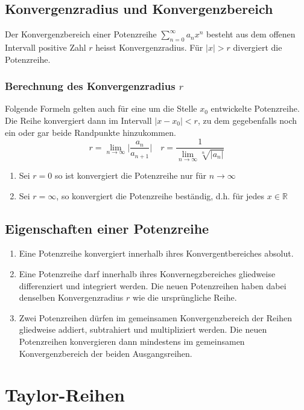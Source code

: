 \subsection{Konvergenzradius und Konvergenzbereich}

Der Konvergenzbereich einer Potenzreihe $\displaystyle \sum_{n=0}^{\infty}a_nx^n$ besteht aus dem offenen Intervall positive Zahl $r$ heisst Konvergenzradius. Für $\Big\vert x\Big\vert>r$ divergiert die Potenzreihe.
\subsubsection{Berechnung des Konvergenzradius $r$}
Folgende Formeln gelten auch für eine um die Stelle $x_0$ entwickelte Potenzreihe. Die Reihe konvergiert dann im Intervall $\Big\vert x-x_0\Big\vert<r$, zu dem gegebenfalls noch ein oder gar beide Randpunkte hinzukommen. 
\begin{equation} 
\boxed{r=\displaystyle \lim_{n\rightarrow \infty}\Big\vert \dfrac{a_n}{a_{n+1}}\Big\vert}\quad \boxed{r=\dfrac{1}{\displaystyle \lim_{n\rightarrow \infty}\sqrt[n]{\Big\vert a_n\Big\vert}}}
\end{equation} 
\begin{enumerate}[$(i)$]
\item Sei $r=0$ so ist konvergiert die Potenzreihe nur für $n\rightarrow \infty$
\item Sei $r=\infty$, so konvergiert die Potenzreihe beständig, d.h. für jedes $x\in \mathbb{R}$ 
\end{enumerate}
\subsection{Eigenschaften einer Potenzreihe}
\begin{enumerate}[$(i)$]
\item Eine Potenzreihe konvergiert innerhalb ihres Konvergentbereiches absolut.
\item Eine Potenzreihe darf innerhalb ihres Konvernegzbereiches gliedweise differenziert und integriert werden. Die neuen Potenzreihen haben dabei denselben Konvergenzradius $r$ wie die ursprüngliche Reihe.
\item Zwei Potenzreihen dürfen im gemeinsamen Konvergenzbereich der Reihen gliedweise addiert, subtrahiert und multipliziert werden. Die neuen Potenzreihen konvergieren dann mindestens im gemeinsamen Konvergenzbereich der beiden Ausgangsreihen. 
\end{enumerate}
\section{Taylor-Reihen}
